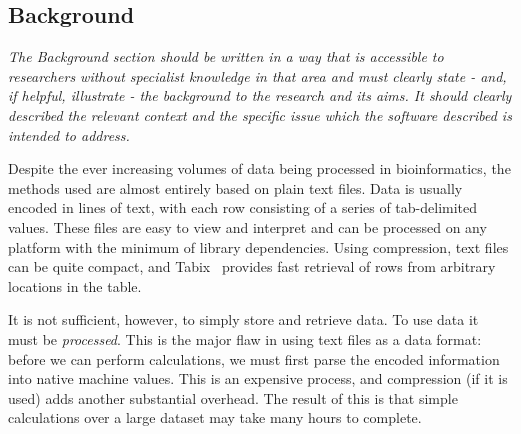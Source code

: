 \documentclass[10pt]{bmc_article}
\newenvironment{bmcformat}{\begin{raggedright}\baselineskip20pt\sloppy\setboolean{publ}{false}}{\end{raggedright}\baselineskip20pt\sloppy}
\begin{document}
\begin{bmcformat}


\section*{Background} 

\emph{The Background section should be written in a
way that is accessible to researchers without specialist knowledge in
that area and must clearly state - and, if helpful, illustrate - the
background to the research and its aims. It should clearly described the
relevant context and the specific issue which the software described is
intended to address.}

Despite the ever increasing volumes of data being processed in bioinformatics,
the methods used are almost entirely based on plain text files. Data is 
usually encoded in lines of text, with each row consisting of a series of tab-delimited 
values.
These files are easy to view and interpret and can be processed on 
any platform with the minimum of library dependencies. Using compression,
text files can be quite compact, and Tabix~\cite{li11} provides  
fast retrieval of rows from arbitrary locations in the table.

It is not sufficient, however, to simply store and retrieve data. To use data
it must be \emph{processed}. This is the major flaw in 
using text files as a data format: before we can perform calculations, we 
must first parse the encoded information into native 
machine values. This is an expensive process, and 
compression (if it is used) adds another substantial overhead. The result 
of this is that simple calculations over a large dataset may take 
many hours to complete.


\end{bmcformat}
\end{document}
